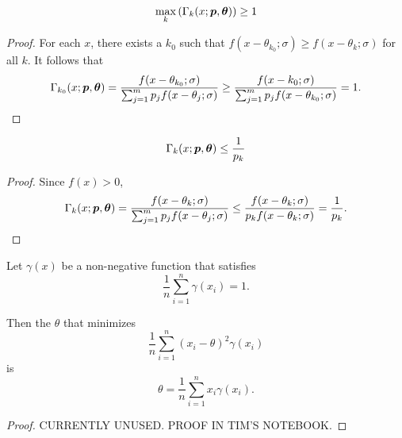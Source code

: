 		\begin{lemma}
		\label{lem:maxkGamma}
			\begin{equation}
				\max_k \left( \Gamma_k(x;{\bm{{p}}},{\bm{{\theta}}}) \right) \geq 1
			\end{equation}
		\end{lemma}	
		\begin{proof}
			For each $x$, there exists a $k_0$ such that $f(x - \theta_{k_0};\sigma) \geq f(x - \theta_k;\sigma)$ for all $k$. It follows that
			\begin{equation}
				\Gamma_{k_0}(x;{\bm{{p}}},{\bm{{\theta}}}) = \frac{f(x - \theta_{k_0};\sigma)}{\sum_{j=1}^m p_j f(x - \theta_j;\sigma)} \geq \frac{f(x - k_0;\sigma)}{\sum_{j=1}^m p_j f(x - \theta_{k_0};\sigma)} = 1.
			\end{equation}
		\end{proof}

		\begin{lemma}
			\begin{equation}
			\Gamma_k(x;{\bm{{p}}},{\bm{{\theta}}}) \leq \frac{1}{p_k}
			\end{equation}
		\end{lemma}
		\begin{proof}
			Since $f(x) > 0$,
			\begin{equation}
				\Gamma_k(x;{\bm{{p}}},{\bm{{\theta}}}) = \frac{f(x - \theta_k;\sigma)}{\sum_{j=1}^m p_j f(x - \theta_j;\sigma)} \leq \frac{f(x - \theta_k;\sigma)}{p_k f(x - \theta_k;\sigma)} = \frac{1}{p_k}.
			\end{equation}
		\end{proof}

		\begin{lemma}
			Let $\gamma(x)$ be a non-negative function that satisfies
			\begin{equation}
				\frac{1}{n} \sum_{i=1}^n \gamma(x_i) = 1.
			\end{equation}

			Then the $\theta$ that minimizes 
			\begin{equation}
				\frac{1}{n} \sum_{i=1}^n (x_i - \theta)^2 \gamma(x_i)
			\end{equation}
			is
			\begin{equation}
				\theta = \frac{1}{n} \sum_{i=1}^n x_i \gamma(x_i).
			\end{equation}
		\end{lemma}
		\begin{proof}
			CURRENTLY UNUSED. PROOF IN TIM'S NOTEBOOK.
		\end{proof}

